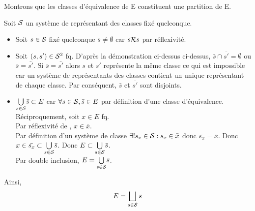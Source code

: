 \documentclass{article}
\renewenvironment{question_kholle}[2][ ]
{
	\subsection{\texorpdfstring{#2}{}}
	\notblank{#1}
	{
		\noindent #1
		\bigbreak
	}
	{}
	\begin{proof}
}
{
	\end{proof}
}
\begin{document}
\begin{question_kholle}
  Montrons que les classes d'équivalence de E constituent une partition de E.
  
  Soit $\mathcal S$ un système de représentant des classes fixé quelconque.
  
  \begin{itemize}[label=\textemdash]
    \item Soit $s\in \mathcal S$ fixé quelconque $\bar{s} \neq \emptyset$ car $s \mathcal R s$ par réflexivité.
    \item Soit $(s, s') \in \mathcal S^2$ fq. D'après la démonstration ci-dessus ci-dessus, $\bar{s} \cap \bar{s'} = \emptyset$ ou $\bar{s} = \bar{s'}$. Si $\bar{s} = \bar{s'}$ alors $s$ et $s'$ représente la même classe ce qui est impossible car un système de représentants des classes contient un unique représentant de chaque classe. Par conséquent, $\bar{s}$ et $\bar{s'}$ sont disjoints.
    \item $\underset{s \in \mathcal S}{\bigcup} \bar{s} \subset E$ car $\forall s \in \mathcal S, \bar{s} \in E$ par définition d'une classe d'équivalence. \\
    Réciproquement, soit $x \in E$ fq. \\
    Par réflexivité de \Rel, $x \in \bar{x}$. \\
    Par définition d'un système de classe $\exists ! s_x \in \mathcal S : s_x \in \bar{x}$ donc $\bar{s_x} = \bar{x}$. Donc $x \in \bar{s_x} \subset \underset{s \in \mathcal S}{\bigcup} \bar{s}$. Donc $E \subset \underset{s \in \mathcal S}{\bigcup} \bar{s}$. \\
    Par double inclusion, $E = \underset{s \in \mathcal S}{\bigcup} \bar{s}$.
  \end{itemize}
  
  Ainsi,
  $$E = \bigsqcup_{s \in \mathcal S} \bar{s}$$
  
\end{question_kholle}
\end{document}
